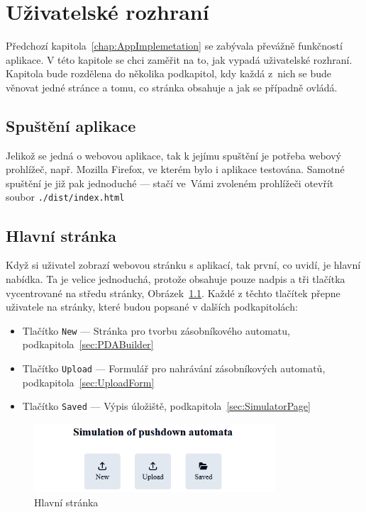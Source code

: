 \chapter{Uživatelské rozhraní}\label{chap:UI}

Předchozí kapitola~\ref{chap:AppImplemetation} se zabývala převážně funkčností aplikace. V této kapitole se chci zaměřit na to, jak vypadá uživatelské rozhraní. Kapitola bude rozdělena do několika podkapitol, kdy každá z~nich se bude věnovat jedné stránce a tomu, co stránka obsahuje a jak se případně ovládá. 

\section{Spuštění aplikace}

Jelikož se jedná o webovou aplikace, tak k jejímu spuštění je potřeba webový prohlížeč, např. Mozilla Firefox, ve kterém bylo i aplikace testována. Samotné spuštění je již pak jednoduché --- stačí ve~Vámi zvoleném prohlížeči otevřít soubor \texttt{./dist/index.html}

\section{Hlavní stránka}

Když si uživatel zobrazí webovou stránku s aplikací, tak první, co uvidí, je hlavní nabídka. Ta je velice jednoduchá, protože obsahuje pouze nadpis a tři tlačítka vycentrované na středu stránky, Obrázek~\ref{fig:UIMainPage}. Každé z těchto tlačítek přepne uživatele na stránky, které budou popsané v dalších podkapitolách:
\begin{itemize}
    \item Tlačítko \texttt{New} --- Stránka pro tvorbu zásobníkového automatu, podkapitola~\ref{sec:PDABuilder}
    \item Tlačítko \texttt{Upload} --- Formulář pro nahrávání zásobníkových automatů, podkapitola~\ref{sec:UploadForm}
    \item Tlačítko \texttt{Saved} --- Výpis úložiště, podkapitola~\ref{sec:SimulatorPage}
\end{itemize}

\begin{figure}[h]
    \centering
    \includegraphics[width=0.8\textwidth]{Figures/PrntScrn_UI_MainMenu.png}
    \caption{Hlavní stránka}\label{fig:UIMainPage}
\end{figure}

